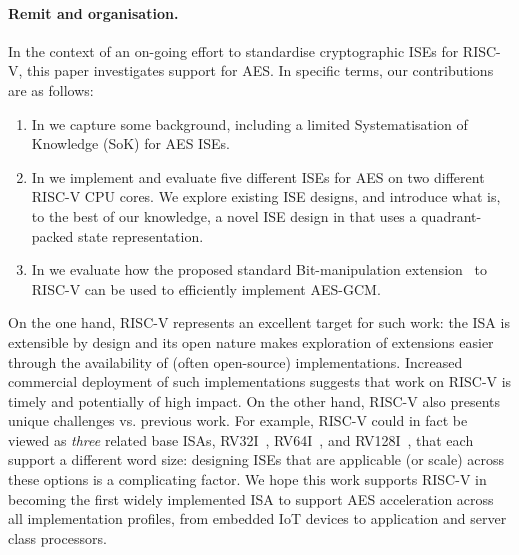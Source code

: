 
\paragraph{Remit and organisation.}

In the context of an on-going effort to standardise cryptographic ISEs for
RISC-V, this paper investigates support for AES.
In specific terms, our contributions are as follows:

\begin{enumerate}

\item In 
      we capture some background, including a limited
      Systematisation of Knowledge (SoK)
      for AES ISEs.

\item In 
      we implement and evaluate five different ISEs for AES on two different 
      RISC-V CPU cores.
      We explore existing ISE designs, 
      and introduce what is, to the best of our knowledge, a novel ISE design
      in  
      that uses a quadrant-packed state representation.

\item In
      we evaluate how the
      proposed standard 
      Bit-manipulation
      extension~\cite[Section 21]{RV:ISA:I:19}
      to RISC-V can be used to efficiently implement AES-GCM.

\end{enumerate}

\noindent
On the one hand, 
RISC-V represents an excellent target for such work:
the ISA is extensible by design and its open nature makes
exploration of extensions easier through the availability of
(often open-source) implementations.  
Increased commercial deployment of such implementations suggests that work 
on RISC-V is timely and potentially of high impact.
On the other hand, RISC-V also presents unique challenges vs. previous work.
For example,
RISC-V could in fact be viewed as {\em three} related base ISAs,
 RV32I~\cite[Section 2]{RV:ISA:I:19},
 RV64I~\cite[Section 5]{RV:ISA:I:19},
and
RV128I~\cite[Section 6]{RV:ISA:I:19},
that each support a different word size:
designing ISEs that are applicable (or scale) across these options is a
complicating factor.
We hope this work supports RISC-V in becoming the
first widely implemented ISA to support AES acceleration across
all implementation profiles, from embedded IoT devices to application
and server class processors.

%


